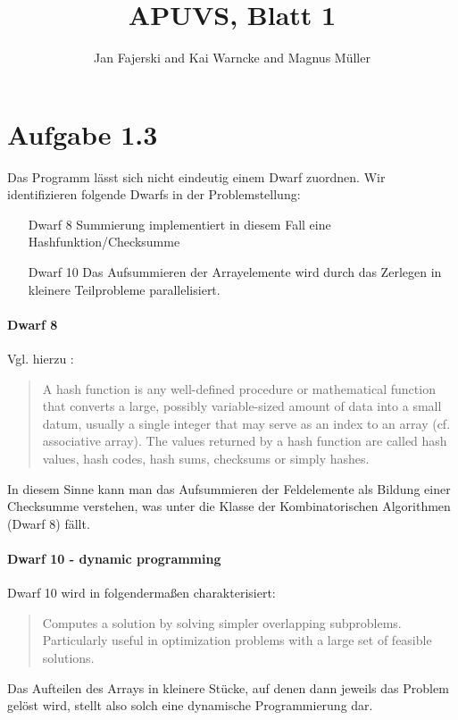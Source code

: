 \documentclass[a4paper,
               12pt,
               BCOR12mm,
               ]{scrartcl}
\title{APUVS, Blatt 1}
\author{Jan Fajerski and Kai Warncke and Magnus Müller}
\begin{document}
\maketitle  
  \section*{Aufgabe 1.3}
		Das Programm lässt sich nicht eindeutig einem Dwarf zuordnen. Wir identifizieren folgende
		Dwarfs in der Problemstellung:
    \begin{itemize}
      \item [Dwarf 8] Summierung implementiert in diesem Fall eine Hashfunktion/Checksumme
      \item [Dwarf 10] Das Aufsummieren der Arrayelemente wird durch das Zerlegen in kleinere Teilprobleme parallelisiert.
    \end{itemize}
		
		\paragraph{Dwarf 8}
		Vgl. hierzu \cite{wiki_hash}:
		\begin{quotation}
			A hash function is any well-defined procedure or mathematical function that converts
			a large, possibly variable-sized amount of data into a small datum, usually a single
			integer that may serve as an index to an array (cf. associative array). The values
			returned by a hash function are called hash values, hash codes, hash sums, checksums
			or simply hashes.
		\end{quotation}
		In diesem Sinne kann man das Aufsummieren der Feldelemente als Bildung einer
		Checksumme verstehen, was unter die Klasse der Kombinatorischen Algorithmen (Dwarf 8)
		fällt.

		\paragraph{Dwarf 10 - dynamic programming}
		Dwarf 10 wird in \cite[S. 16]{eecs} folgendermaßen charakterisiert:
		\begin{quotation}
			Computes a solution by solving simpler overlapping subproblems.
			Particularly useful in optimization problems with a large set of feasible
			solutions.
		\end{quotation}
		Das Aufteilen des Arrays in kleinere Stücke, auf denen dann jeweils das Problem gelöst
		wird, stellt also solch eine dynamische Programmierung dar.
\end{document}
